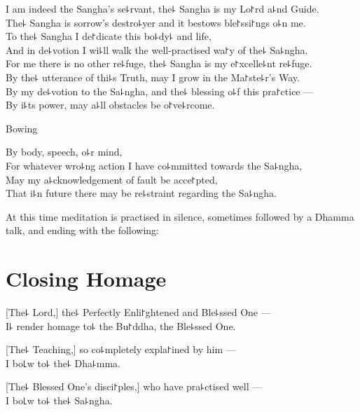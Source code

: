 I am indeed the Sangha's se꜕rvant, the꜕ Sangha is my Lo꜓rd a꜕nd Guide.\\%
The꜕ Sangha is sorrow's destro꜕yer and it bestows ble꜓ssi꜓ngs o꜕n me.\\
To the꜕ Sangha I de꜓dicate this bo꜕dy꜕ and life,\\
And in de꜕votion I wi꜕ll walk the well-practised wa꜓y of the꜕ Sa꜕ngha.\\
For me there is no other re꜕fuge, the꜕ Sangha is my e꜓xcelle꜕nt re꜕fuge.\\
By the꜕ utterance of thi꜕s Truth, may I grow in the Ma꜓ste꜕r's Way.\\
By my de꜕votion to the Sa꜕ngha, and the꜕ blessing o꜕f this pra꜓ctice ---\\
By i꜕ts power, may a꜕ll obstacles be o꜓ve꜕rcome.

\begin{instruction}
  Bowing
\end{instruction}

By body, speech, o꜕r mind,\\
For whatever wro꜕ng action I have co꜕mmitted towards the Sa꜕ngha,\\
May my a꜕cknowledgement of fault be acce꜓pted,\\
That i꜕n future there may be re꜕straint regarding the Sa꜕ngha.

\vfill

\begin{instruction}
  At this time meditation is practised in silence, sometimes followed by a Dhamma talk, and ending with the following:
\end{instruction}

\chapter{Closing Homage}%

[The꜕ Lord,] the꜕ Perfectly Enli꜓ghtened and Ble꜕ssed One ---\\
I꜕ render homage to꜕ the Bu꜓ddha, the Ble꜕ssed One. 

[The꜕ Teaching,] so co꜕mpletely expla꜓ined by him ---\\
I bo꜖w to꜕ the꜕ Dha꜕mma. 

[The꜕ Blessed One's disci꜓ples,] who have pra꜕ctised well ---\\
I bo꜖w to꜕ the꜕ Sa꜕ngha. 


